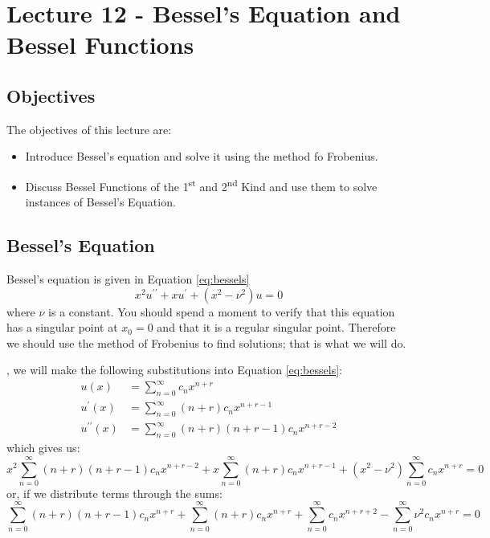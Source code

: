 \chapter{Lecture 12 - Bessel's Equation and Bessel Functions}
\label{ch:lec12}
\section{Objectives}
The objectives of this lecture are:
\begin{itemize}
\item Introduce Bessel's equation and solve it using the method fo Frobenius.
\item Discuss Bessel Functions of the 1\textsuperscript{st} and 2\textsuperscript{nd} Kind and use them to solve instances of Bessel's Equation.
\end{itemize}

\section{Bessel's Equation}

Bessel's equation is given in Equation \ref{eq:bessels}
\begin{equation}
x^{2}u^{\prime \prime} + x u^{\prime} + \left(x^2 - \nu^2\right)u = 0
\label{eq:bessels}
\end{equation}
where $\nu$ is a constant.  You should spend a moment to verify that this equation has a singular point at $x_0 = 0$ and that it is a regular singular point.  Therefore we should use the method of Frobenius to find solutions; that is what we will do.

, we will make the following substitutions into Equation \ref{eq:bessels}:
\begin{align*}
u(x) &= \sum\limits_{n=0}^{\infty}c_n x^{n+r} \\
u^{\prime}(x) &= \sum\limits_{n=0}^{\infty} (n+r)c_nx^{n+r-1} \\
u^{\prime \prime}(x) &= \sum\limits_{n=0}^{\infty}(n+r)(n+r-1)c_nx^{n+r-2}
\end{align*}
which gives us:
\begin{equation*}
x^2\sum\limits_{n=0}^{\infty}(n+r)(n+r-1)c_nx^{n+r-2} + x\sum\limits_{n=0}^{\infty}(n+r)c_nx^{n+r-1} + \left(x^2-\nu^2 \right)\sum\limits_{n=0}^{\infty}c_nx^{n+r} = 0 
\end{equation*}
\noindent or, if we distribute terms through the sums:
\begin{equation*}
\sum\limits_{n=0}^{\infty}(n+r)(n+r-1)c_nx^{n+r} + \sum\limits_{n=0}^{\infty}(n+r)c_nx^{n+r} + \sum\limits_{n=0}^{\infty}c_nx^{n+r+2} - \sum\limits_{n=0}^{\infty}\nu^2c_nx^{n+r} = 0 
\end{equation*}

